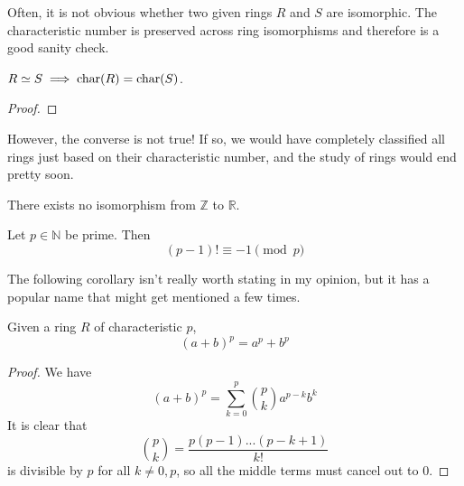   Often, it is not obvious whether two given rings $R$ and $S$ are isomorphic. The characteristic number is preserved across ring isomorphisms and therefore is a good sanity check. 

  \begin{theorem}
    $R \simeq S \implies \operatorname{char}(R) = \operatorname{char}(S)$. 
  \end{theorem}
  \begin{proof}

  \end{proof}

  However, the converse is not true! If so, we would have completely classified all rings just based on their characteristic number, and the study of rings would end pretty soon. 

  \begin{example}
    There exists no isomorphism from $\mathbb{Z}$ to $\mathbb{R}$. 
  \end{example}

  \begin{theorem}
    Let $p \in \mathbb{N}$ be prime. Then 
    \begin{equation}
      (p-1)! \equiv -1 \pmod{p}
    \end{equation}
  \end{theorem}
  
  The following corollary isn't really worth stating in my opinion, but it has a popular name that might get mentioned a few times. 

  \begin{corollary}
    Given a ring $R$ of characteristic $p$, 
    \begin{equation}
      (a + b)^p = a^p + b^p
    \end{equation}
  \end{corollary}
  \begin{proof}
    We have 
    \begin{equation}
      (a + b)^p = \sum_{k = 0}^p \binom{p}{k} a^{p-k} b^{k}
    \end{equation}
    It is clear that 
    \begin{equation}
      \binom{p}{k} = \frac{p (p-1) ... (p - k+1)}{k!}
    \end{equation}
    is divisible by $p$ for all $k \neq 0, p$, so all the middle terms must cancel out to $0$. 
  \end{proof}

